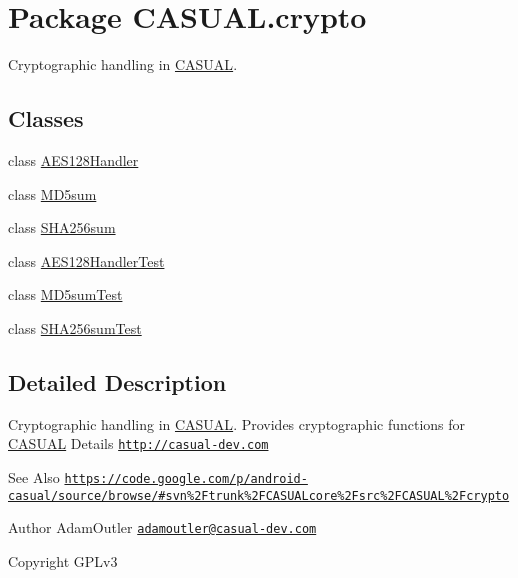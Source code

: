 \hypertarget{namespaceCASUAL_1_1crypto}{\section{Package C\-A\-S\-U\-A\-L.\-crypto}
\label{namespaceCASUAL_1_1crypto}
}


Cryptographic handling in \hyperlink{namespaceCASUAL}{C\-A\-S\-U\-A\-L}.  


\subsection*{Classes}
\begin{DoxyCompactItemize}
\item 
class \hyperlink{classCASUAL_1_1crypto_1_1AES128Handler}{A\-E\-S128\-Handler}
\item 
class \hyperlink{classCASUAL_1_1crypto_1_1MD5sum}{M\-D5sum}
\item 
class \hyperlink{classCASUAL_1_1crypto_1_1SHA256sum}{S\-H\-A256sum}
\item 
class \hyperlink{classCASUAL_1_1crypto_1_1AES128HandlerTest}{A\-E\-S128\-Handler\-Test}
\item 
class \hyperlink{classCASUAL_1_1crypto_1_1MD5sumTest}{M\-D5sum\-Test}
\item 
class \hyperlink{classCASUAL_1_1crypto_1_1SHA256sumTest}{S\-H\-A256sum\-Test}
\end{DoxyCompactItemize}


\subsection{Detailed Description}
Cryptographic handling in \hyperlink{namespaceCASUAL}{C\-A\-S\-U\-A\-L}. Provides cryptographic functions for \hyperlink{namespaceCASUAL}{C\-A\-S\-U\-A\-L} Details \href{http://casual-dev.com}{\tt http\-://casual-\/dev.\-com} \begin{DoxySeeAlso}{See Also}
\href{https://code.google.com/p/android-casual/source/browse/#svn%2Ftrunk%2FCASUALcore%2Fsrc%2FCASUAL%2Fcrypto}{\tt https\-://code.\-google.\-com/p/android-\/casual/source/browse/\#svn\%2\-Ftrunk\%2\-F\-C\-A\-S\-U\-A\-Lcore\%2\-Fsrc\%2\-F\-C\-A\-S\-U\-A\-L\%2\-Fcrypto} 
\end{DoxySeeAlso}
\begin{DoxyAuthor}{Author}
Adam\-Outler \href{mailto:adamoutler@casual-dev.com}{\tt adamoutler@casual-\/dev.\-com} 
\end{DoxyAuthor}
\begin{DoxyCopyright}{Copyright}
G\-P\-Lv3 
\end{DoxyCopyright}
